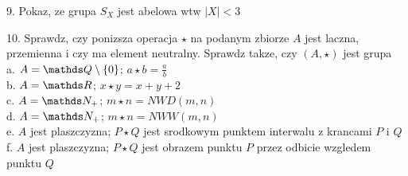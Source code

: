 \documentclass{article}[13pt]
\begin{document}
    9. Pokaz, ze grupa $S_X$ jest abelowa wtw $|X|<3$
    \medskip

    10. Sprawdz, czy ponizsza operacja $\star$ na podanym zbiorze $A$ jest laczna, przemienna i czy ma element neutralny. Sprawdz takze, czy $(A, \star)$ jest grupa\\
        \indent a. $A=\Q\setminus\{0\}$; $a\star b=\frac ab$\\
        \indent b. $A=\R$; $x\star y=x+y+2$\\
        \indent c. $A=\N_+$; $m\star n =NWD(m,n)$\\
        \indent d. $A=\N_+$; $m\star n=NWW(m,n)$\\
        \indent e. $A$ jest plaszczyzna; $P\star Q$ jest srodkowym punktem interwalu z krancami $P$ i $Q$\\
        \indent f. $A$ jest plaszczyzna; $P\star Q$ jest obrazem punktu $P$ przez odbicie wzgledem punktu $Q$
\end{document}
